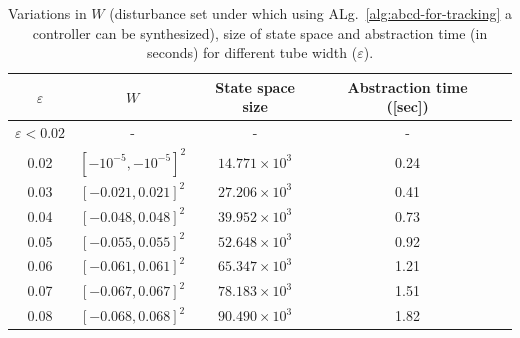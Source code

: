\begin{table}[h!]
	\centering
	\caption{Variations in $W$ (disturbance set under which using ALg.~\ref{alg:abcd-for-tracking} a controller can be synthesized), size of state space and abstraction time (in seconds) for different tube width ($\varepsilon$).}
	\vspace{1mm}
	\begin{tabular}{|c|c|c|c|c|}
		\hline
		$\varepsilon$ &  $W$  & State space size & Abstraction time ([sec])  \\
		\hline
		$\varepsilon<0.02$  & -    & -  & -  \\
		\hline
		0.02   & $[-10^{-5},-10^{-5}]^2$    & $14.771\times 10^3$  & 0.24  \\
		\hline
		0.03   & $[-0.021,0.021]^2$   & $27.206 \times 10^3$ & 0.41  \\
		\hline
		0.04    & $[-0.048,0.048]^2$  & $39.952\times 10^3$  & 0.73  \\
		\hline
		0.05  &  $[-0.055,0.055]^2$   & $52.648 \times 10^3$  & 0.92  \\
		\hline
		0.06    & $[-0.061,0.061]^2$  & $65.347 \times 10^3$  & 1.21  \\
		\hline
		0.07   &$[-0.067,0.067]^2$  & $78.183 \times 10^3$     & 1.51 \\
		\hline
		0.08   &$[-0.068,0.068]^2$  & $90.490 \times 10^3$     & 1.82 \\
		\hline
	\end{tabular}
	\label{tab:inv_pend}
\end{table}
